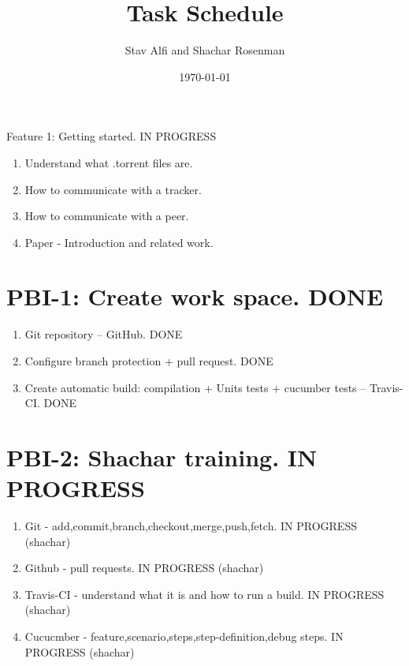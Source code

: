 \documentclass[11pt]{article}
\title{{\Huge   Task Schedule}}
\author{Stav Alfi and Shachar Rosenman}
\date{\today}
\begin{document}
\maketitle



\begin{Large}
Feature 1: Getting started. \colorbox{gray!10}{IN PROGRESS}
\end{Large}

\begin{enumerate}[label=(\roman*)]

\item Understand what .torrent files are.
\item How to communicate with a tracker.
\item How to communicate with a peer.
\item Paper - Introduction and related work.
\end{enumerate}



\section{PBI-1: Create work space. DONE}
\begin{enumerate}
\item Git repository – GitHub. \colorbox{gray!20}{DONE}
\item Configure branch protection + pull request.  \colorbox{gray!20}{DONE}
\item Create automatic build: compilation + Units tests + cucumber tests – Travis-CI.  \colorbox{gray!20}{DONE}
\end{enumerate}

\section{PBI-2: Shachar training. IN PROGRESS}
\begin{enumerate}
\item Git - add,commit,branch,checkout,merge,push,fetch.  \colorbox{gray!20}{IN PROGRESS} (shachar)
\item Github - pull requests. \colorbox{gray!20}{IN PROGRESS} (shachar)
\item Travis-CI - understand what it is and how to run a build. \colorbox{gray!20}{IN PROGRESS} (shachar)
\item Cucucmber - feature,scenario,steps,step-definition,debug steps. \colorbox{gray!20}{IN PROGRESS} (shachar)
\end{enumerate}
\end{document}
